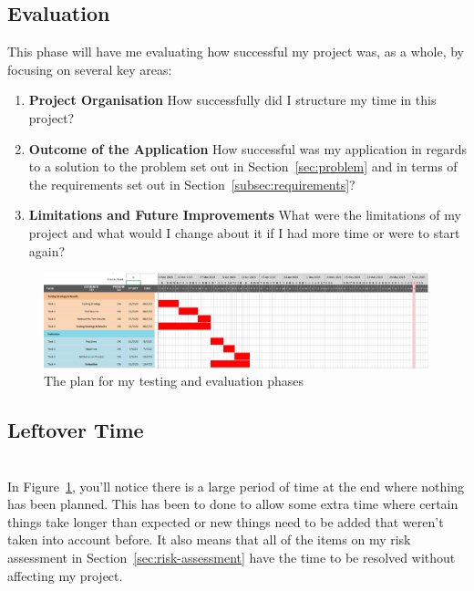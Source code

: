 \subsection*{Evaluation}
This phase will have me evaluating how successful my project was, as a whole, by focusing on several key areas:

\begin{enumerate}
  \item \textbf{Project Organisation} How successfully did I structure my time in this project?
  \item \textbf{Outcome of the Application} How successful was my application in regards to a solution to the problem set out in Section~\ref{sec:problem} and in terms of the requirements set out in Section~\ref{subsec:requirements}?
  \item \textbf{Limitations and Future Improvements} What were the limitations of my project and what would I change about it if I had more time or were to start again?
\end{enumerate}

\begin{figure}[ht]
  \centering
  \includegraphics[width=\textwidth]{assets/images/charts/gantt/testing-evaluation.png}
  \caption{The plan for my testing and evaluation phases}
  \label{fig:final-gantt}
\end{figure}

\subsection*{Leftover Time}

\tbd\\\noindent
In Figure~\ref{fig:final-gantt}, you'll notice there is a large period of time at the end where nothing has been planned. This has been to done to allow some extra time where certain things take longer than expected or new things need to be added that weren't taken into account before. It also means that all of the items on my risk assessment in Section~\ref{sec:risk-assessment} have the time to be resolved without affecting my project.

